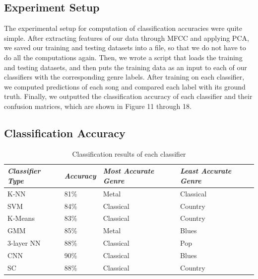\subsection{Experiment Setup}
The experimental setup for computation of classification accuracies were quite simple. After extracting features of our data through MFCC and applying PCA, we saved our training and testing datasets into a file, so that we do not have to do all the computations again. Then, we wrote a script that loads the training and testing datasets, and then puts the training data as an input to each of our classifiers with the corresponding genre labels. After training on each classifier, we computed predictions of each song and compared each label with its ground truth. Finally, we outputted the classification accuracy of each classifier and their confusion matrices, which are shown in Figure 11 through 18.

\subsection{Classification Accuracy}

\begin{table}
\begin{center}
\caption{Classification results of each classifier} 
\begin{tabular}{ p{1.9cm} p{1.1cm} p{2.8cm} p{2.8cm}}
 \emph{Classifier Type} & \emph{Accuracy}  & \emph{Most Accurate Genre} & \emph{Least Accurate Genre}\\
 \hline
 K-NN & 81\% & Metal & Classical \\
 SVM & 84\% & Classical & Country \\
 K-Means & 83\% & Classical & Country \\
 GMM & 85\% & Metal & Blues \\
 3-layer NN & 88\% & Classical & Pop \\
 CNN & 90\% & Classical & Blues \\
 SC & 88\% & Classical  & Country  \\
\end{tabular}
\end{center}
\end{table}

